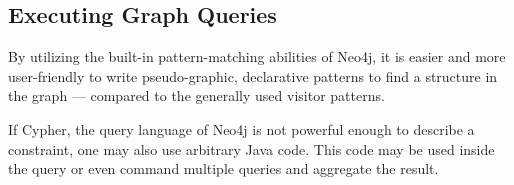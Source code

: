 
\subsection{Executing Graph Queries}
By utilizing the built-in pattern-matching abilities of Neo4j, it is easier and more user-friendly to write pseudo-graphic, declarative patterns to find a structure in the graph --- compared to the generally used visitor patterns.


If Cypher, the query language of Neo4j is not powerful enough to describe a constraint, one may also use arbitrary Java code. This code may be used inside the query or even command multiple queries and aggregate the result.
